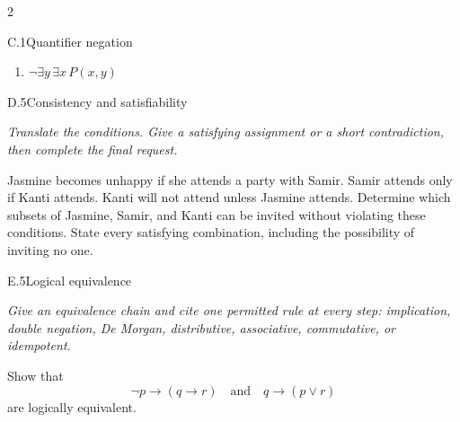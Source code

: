 \documentclass[9pt]{extarticle}
\begin{document}
\begin{multicols}{2}
\begin{CoreProblem}{C.1}{Quantifier negation}
\begin{enumerate}[label=(\alph*)]
  \item $\neg\exists y\,\exists x\,P(x,y)$
\end{enumerate}
\end{CoreProblem}
\columnbreak
\begin{CoreProblem}{D.5}{Consistency and satisfiability}
{\scriptsize\textit{Translate the conditions. Give a satisfying assignment or a short contradiction, then complete the final request.}\par}
Jasmine becomes unhappy if she attends a party with Samir. Samir attends only
if Kanti attends. Kanti will not attend unless Jasmine attends. Determine which
subsets of Jasmine, Samir, and Kanti can be invited without violating these
conditions. State every satisfying combination, including the possibility of
inviting no one.
\end{CoreProblem}
\begin{CoreProblem}{E.5}{Logical equivalence}
{\scriptsize\textit{Give an equivalence chain and cite one permitted rule at every step: implication, double negation, De Morgan, distributive, associative, commutative, or idempotent.}\par}
Show that
\[
  \neg p\to(q\to r)
  \quad\text{and}\quad
  q\to(p\lor r)
\]
are logically equivalent.
\end{CoreProblem}
\end{multicols}
\CoreWorkArea
\FormBreak
{}
\end{document}
